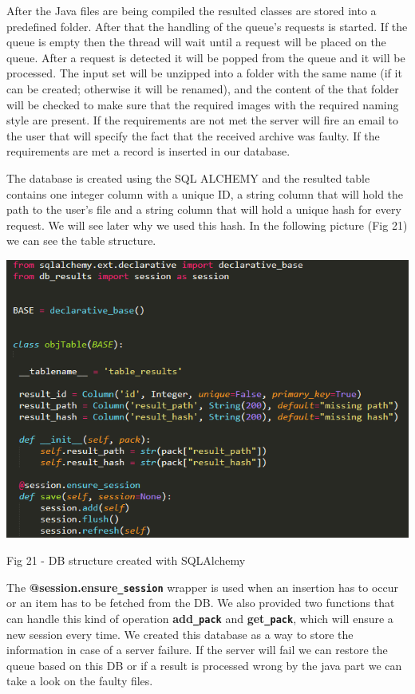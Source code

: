 \documentclass[12pt, a4paper]{report}
\begin{document}
After the Java files are being compiled the resulted classes are stored into a predefined folder. After that the handling of the queue's requests is started. If the queue is empty then the thread will wait until a request will be placed on the queue. After a request is detected it will be popped from the queue and it will be processed. The input set will be unzipped into a folder with the same name (if it can be created; otherwise it will be renamed), and the content of the that folder will be checked to make sure that the required images with the required naming style are present. If the requirements are not met the server will fire an email to the user that will specify the fact that the received archive was faulty. If the requirements are met a record is inserted in our database.
\par 

The database is created using the SQL ALCHEMY and the resulted table contains one integer column with a unique ID, a string column that will hold the path to the user's file and a string column that will hold a unique hash for every request. We will see later why we used this hash. In the following picture (Fig 21) we can see the table structure.
\par

\medskip
\includegraphics[scale=0.9, right]{database_table.png}
\begin{center}
Fig 21 - DB structure created with SQLAlchemy 
\end{center}
\par 

The \textbf{@session.ensure\texttt{\_session}} wrapper is used when an insertion has to occur or an item has to be fetched from the DB. We also provided two functions that can handle this kind of operation \textbf{add\texttt{\_pack}} and \textbf{get\texttt{\_pack}}, which will ensure a new session every time. We created this database as a way to store the information in case of a server failure. If the server will fail we can restore the queue based on this DB or if a result is processed wrong by the java part we can take a look on the faulty files.
\par 
\end{document}
